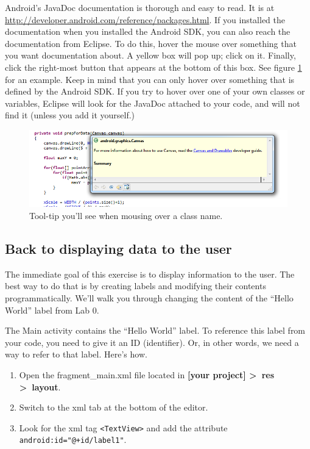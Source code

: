 \documentclass[10pt]{article}
\begin{document}
Android's JavaDoc documentation is thorough and easy to read. It is at \url{http://developer.android.com/reference/packages.html}. If you installed the documentation when you installed the Android SDK, you can also reach the documentation from Eclipse. To do this, hover the mouse over something that you want documentation about. A yellow box will pop up; click on it. Finally, click the right-most button that appears at the bottom of this box. See figure \ref{fig:javadoc-tooltip} for an example. Keep in mind that you can only hover over something that is defined by the Android SDK. If you try to hover over one of your own classes or variables, Eclipse will look for the JavaDoc attached to your code, and will not find it (unless you add it yourself.)

\begin{figure}[ht]
\includegraphics[width=\textwidth]{Javadoc-tooltip.png}
\caption{\label{fig:javadoc-tooltip}Tool-tip you'll see when mousing over a class name.}
\end{figure}

\subsection{Back to displaying data to the user} The immediate goal of this exercise is to display information to the user. The best way to do that is by creating labels and modifying their contents programmatically. We'll walk you through changing the content of the ``Hello World'' label from Lab 0.

The Main activity contains the ``Hello World'' label. To reference this label from your code, you need to give it an ID (identifier). Or, in other words, we need a way to refer to that label. Here's how.
\begin{enumerate}
\item Open the fragment\_main.xml file located in \textbf{[your project] \textgreater~res \textgreater~layout}. 
\item Switch to the xml tab at the bottom of the editor.
\item Look for the xml tag \verb+<TextView>+ and add the attribute \verb-android:id="@+id/label1"-.
\end{enumerate}
\end{document}
